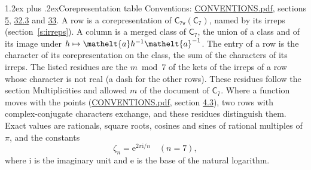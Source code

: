 \documentclass[10pt,a4paper]{article}
\makeatletter
\renewcommand\section{\@startsection{section}{1}{\z@}{-3ex plus -1ex minus -.2ex}%
  {1.2ex plus .2ex}{\normalfont\large\sffamily\bfseries\color{parttitle}}}
\numberwithin{equation}{section}
\newcommand{\eltfont}[1]{{\let\sigma\eltsigma\mathelt{#1}}}
\newcommand{\grp}[1]{\mathsf{#1}}
\newcommand{\elt}[1]{\eltfont{#1}}
\newcommand{\iunit}{\mathrm{i}}
\newcommand{\expe}{\mathrm{e}}
\newcommand{\rootunity}[1]{\zeta_{#1}}
\makeatother
\begin{document}
\section{Corepresentation table}\label{s:character_table}
Conventions: \href{../../CONVENTIONS.pdf}{CONVENTIONS.pdf}, sections \href{../../../rotation/CONVENTIONS.pdf\#conv.5}{5}, \href{../../CONVENTIONS.pdf\#conv.32.3}{32.3} and \href{../../CONVENTIONS.pdf\#conv.33}{33}.
A row is a corepresentation of $\grp{C_{7v}}(\grp{C_{7}})$, named by its irreps (section~\ref{s:irreps}). A column is a merged class of $\grp{C_{7}}$, the union of a class and of its image under $h \mapsto \elt{a} h^{-1} \elt{a}^{-1}$. The entry of a row is the character of its corepresentation on the class, the sum of the characters of its irreps.
\leavevmode\label{n:head.parity}The listed residues are the $m \bmod 7$ of the kets of the irreps of a row whose character is not real (a dash for the other rows). These residues follow the section Multiplicities and allowed $m$ of the document of \href{../../../rotation/data/pdf/C7.pdf}{$\grp{C_{7}}$}. Where a function moves with the points (\href{../../CONVENTIONS.pdf}{CONVENTIONS.pdf}, section \href{../../../rotation/CONVENTIONS.pdf\#conv.4.3}{4.3}), two rows with complex-conjugate characters exchange, and these residues distinguish them.
\leavevmode\label{n:constant.root}\label{n:index.root.order}Exact values are rationals, square roots, cosines and sines of rational multiples of $\pi$, and the constants
\begin{equation}\label{e:constants}\rootunity{n} = \expe^{2\pi\iunit/n}\quad(n = 7),\end{equation}
where $\iunit$ is the imaginary unit and $\expe$ is the base of the natural logarithm.
\end{document}
